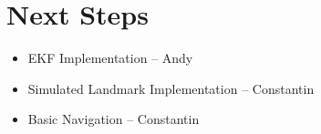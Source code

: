 \documentclass[12pt]{article}
\begin{document}
\section{Next Steps}

\begin{itemize}
    \setlength{\itemsep}{0pt}
    \setlength{\parskip}{0pt}
    \setlength{\parsep}{0pt}
    \item EKF Implementation -- Andy
    \item Simulated Landmark Implementation -- Constantin
    \item Basic Navigation -- Constantin
\end{itemize}
\end{document}
